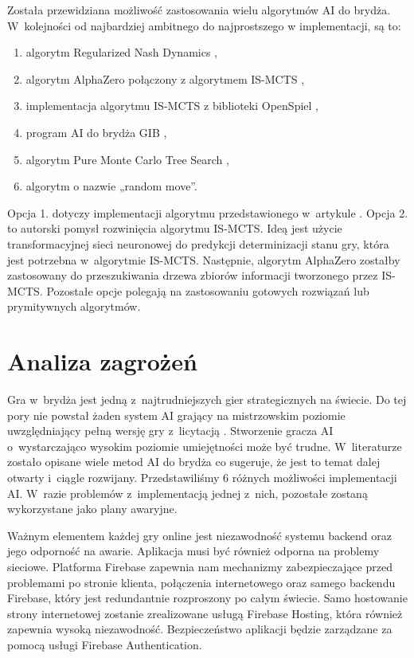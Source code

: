 Została przewidziana możliwość zastosowania wielu algorytmów AI
do brydża. W~kolejności od najbardziej ambitnego do
najprostszego w implementacji, są to:
\begin{enumerate}
  \item algorytm Regularized Nash Dynamics \cite{doi:10.1126/science.add4679},
  \item algorytm AlphaZero \cite{Silver2017MasteringCA} połączony
        z algorytmem IS-MCTS \cite{6203567},
  \item implementacja algorytmu IS-MCTS z biblioteki OpenSpiel \cite{LanctotEtAl2019OpenSpiel},
  \item program AI do brydża GIB \cite{Ginsberg1999GIBST},
  \item algorytm Pure Monte Carlo Tree Search \cite{pmcts},
  \item algorytm o nazwie „random move”.
\end{enumerate}

Opcja 1. dotyczy implementacji algorytmu przedstawionego w~artykule
\cite{doi:10.1126/science.add4679}.
Opcja 2. to autorski pomysł rozwinięcia algorytmu IS-MCTS.
Ideą jest użycie transformacyjnej sieci neuronowej do predykcji
determinizacji stanu gry, która jest potrzebna w~algorytmie IS-MCTS.
Następnie, algorytm AlphaZero zostałby zastosowany do przeszukiwania
drzewa zbiorów informacji tworzonego przez IS-MCTS.
Pozostałe opcje polegają na zastosowaniu gotowych rozwiązań lub
prymitywnych algorytmów.


\section{Analiza zagrożeń}

Gra w~brydża jest jedną z~najtrudniejszych gier strategicznych na świecie.
Do tej pory nie powstał żaden system AI grający na mistrzowskim poziomie
uwzględniający pełną wersję gry z~licytacją \cite{Bethe2021AdvancesIC}.
Stworzenie gracza AI o~wystarczająco wysokim poziomie umiejętności może być
trudne. W~literaturze zostało opisane wiele metod AI do brydża
\cite{Zhang2019DesignAD,Zhang2022TheSO,Zhang2022AIEB,Ginsberg1999GIBST}
co sugeruje, że jest to temat dalej otwarty i~ciągle rozwijany.
Przedstawiliśmy 6 różnych możliwości implementacji AI.
W~razie problemów z~implementacją jednej z~nich, pozostałe
zostaną wykorzystane jako plany awaryjne.

Ważnym elementem każdej gry online jest niezawodność systemu
backend oraz jego odporność na awarie.
Aplikacja musi być również odporna na problemy sieciowe.
Platforma Firebase zapewnia nam mechanizmy zabezpieczające
przed problemami po stronie klienta, połączenia internetowego
oraz samego backendu Firebase, który jest redundantnie
rozproszony po całym świecie.
Samo hostowanie strony internetowej zostanie zrealizowane
usługą Firebase Hosting, która również zapewnia wysoką
niezawodność.
Bezpieczeństwo aplikacji będzie zarządzane za pomocą
usługi Firebase Authentication.

